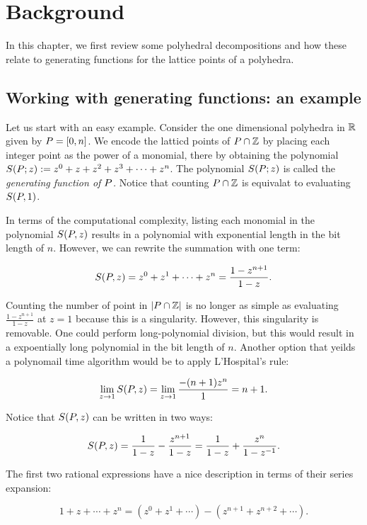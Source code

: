 \chapter{Background}
\label{ch:background} 
   
   In this chapter, we first review some polyhedral decompositions and how these relate to generating functions for the lattice points of a polyhedra. 
   
\section{Working with generating functions: an example}
 
 Let us start with an easy example. Consider the one dimensional polyhedra in ${\mathbb R}$ given by ${ P} = [0, n]$. We encode the latticd points of ${ P} \cap {\mathbb Z}$ by placing each integer point as the power of a monomial, there by obtaining the polynomial $S({ P}; z) := z^0 + z + z^2 + z^3 + \cdots + z^n$. The polynomial $S({ P}; z)$ is called the \emph{generating function of ${ P}$.} Notice that counting ${ P} \cap {\mathbb Z}$ is equivalat to evaluating $S({ P}, 1)$.
 
 In terms of the computational complexity, listing each monomial in the polynomial $S({ P}, z)$ results in a polynomial with exponential length in the bit length of $n$. However, we can rewrite the summation with one term:
 
 \[ S({ P}, z) = z^0 + z^1 + \cdots + z^n = \frac{1-z^{n+1}}{1-z}.\]

Counting the number of point in $|{ P} \cap {\mathbb Z}|$ is no longer as simple as evaluating $\frac{1-z^{n+1}}{1-z}$ at $z=1$ because this is a singularity. However, this singularity is removable. One could perform long-polynomial division, but this would result in a expoentially long polynomial in the bit length of $n$. Another option that yeilds a polynomail time algorithm would be to apply L'Hospital's rule:

\[\lim_{z \rightarrow 1} S({ P}, z) = \lim_{z \rightarrow 1} \frac{-(n+1)z^{n}}{1} = n+1. \]

Notice that $S({ P}, z)$ can be written in two ways:

\[ S({ P}, z) = \frac{1}{1-z} - \frac{z^{n+1}}{1-z} = \frac{1}{1-z} + \frac{z^n}{1-z^{-1}}.\]

The first two rational expressions have a nice description in terms of their series expansion:

\[ 1+z + \cdots + z^n = (z^0 + z^1 + \cdots ) -  (z^{n+1} + z^{n+2} + \cdots).\]


